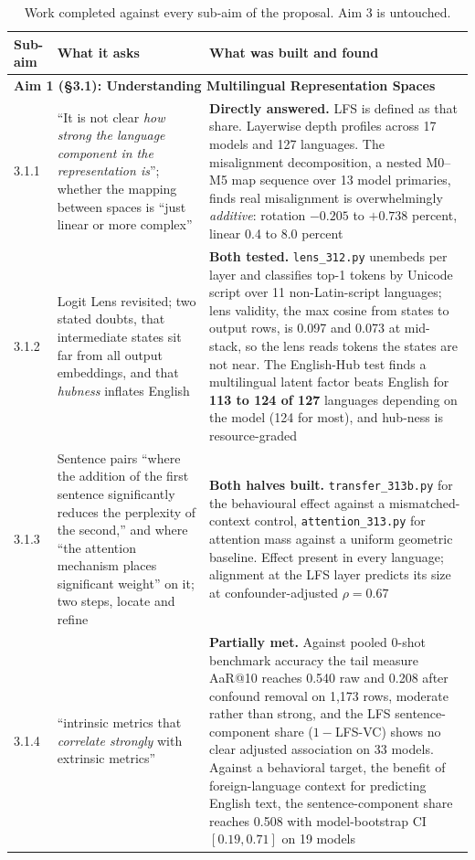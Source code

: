\documentclass[11pt,a4paper]{article}
\begin{document}
\begin{table}[H]
\centering
\small
\caption{Work completed against every sub-aim of the proposal. Aim 3 is
untouched.}
\begin{tabular}{p{1.5cm}p{4.4cm}p{8.3cm}}
\toprule
Sub-aim & What it asks & What was built and found \\
\midrule
\multicolumn{3}{l}{\textbf{Aim 1 (\S3.1): Understanding Multilingual Representation Spaces}} \\[3pt]
3.1.1 & ``It is not clear \emph{how strong the language component in the
representation is}''; whether the mapping between spaces is ``just linear or
more complex'' &
\textbf{Directly answered.} LFS is defined as that share. Layerwise
depth profiles across 17 models and 127 languages. The misalignment decomposition, a
nested M0--M5 map sequence over 13 model primaries, finds real misalignment is
overwhelmingly \emph{additive}: rotation $-0.205$ to $+0.738$ percent, linear
0.4 to 8.0 percent \\[3pt]
3.1.2 & Logit Lens revisited; two stated doubts, that intermediate states sit
far from all output embeddings, and that \emph{hubness} inflates English &
\textbf{Both tested.} \texttt{lens\_312.py} unembeds per layer and classifies
top-1 tokens by Unicode script over 11 non-Latin-script languages; lens
validity, the max cosine from states to output rows, is 0.097 and 0.073 at
mid-stack, so the lens reads tokens the states are not near. The English-Hub
test finds a multilingual latent factor beats English for \textbf{113 to 124 of 127} languages depending on the model (124 for most), and hub-ness is resource-graded \\[3pt]
3.1.3 & Sentence pairs ``where the addition of the first sentence
significantly reduces the perplexity of the second,'' and where ``the
attention mechanism places significant weight'' on it; two steps, locate and
refine &
\textbf{Both halves built.} \texttt{transfer\_313b.py} for the behavioural
effect against a mismatched-context control, \texttt{attention\_313.py} for
attention mass against a uniform geometric baseline. Effect present in every
language; alignment at the LFS layer predicts its size at confounder-adjusted
$\rho = 0.67$ \\[3pt]
3.1.4 & ``intrinsic metrics that \emph{correlate strongly} with extrinsic
metrics'' &
\textbf{Partially met.} Against pooled 0-shot benchmark accuracy the tail measure AaR@10 reaches 0.540 raw and 0.208 after confound removal on 1,173 rows, moderate rather than strong, and the LFS sentence-component share ($1-$LFS-VC) shows no clear adjusted association on 33 models. Against a behavioral target, the benefit of foreign-language context for predicting English text, the sentence-component share reaches 0.508 with model-bootstrap CI $[0.19, 0.71]$ on 19 models \\[3pt]

\end{tabular}
\end{table}
\end{document}

